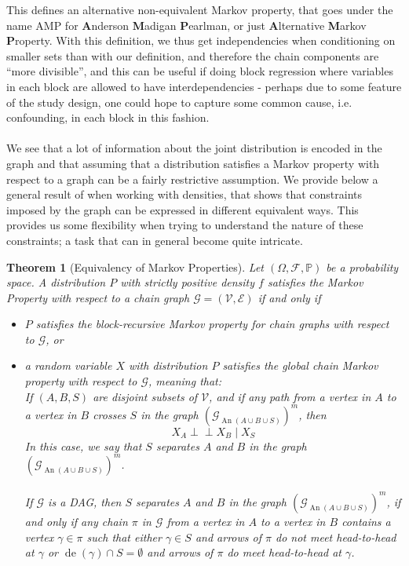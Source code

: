 \documentclass[11pt, a4paper]{memoir}
\theoremstyle{break}
\newtheorem{thm}{Theorem}
\theoremstyle{break}
\theoremstyle{nonumberplain}
\newcommand{\mP}{\mathbb{P}}
\newcommand{\indep}{\perp \!\!\! \perp}
\DeclareMathOperator{\de}{de}
\DeclareMathOperator{\an}{An}
\begin{document}
This defines an alternative non-equivalent Markov property, that goes under the name AMP for \textbf{A}nderson \textbf{M}adigan \textbf{P}earlman, or just \textbf{A}lternative \textbf{M}arkov \textbf{P}roperty. With this definition, we thus get independencies when conditioning on smaller sets than with our definition, and therefore the chain components are \enquote{more divisible}, and this can be useful if doing block regression where variables in each block are allowed to have interdependencies - perhaps due to some feature of the study design, one could hope to capture some common cause, i.e. confounding, in each block in this fashion.
\\\\
We see that a lot of information about the joint distribution is encoded in the graph and that assuming that a distribution satisfies a Markov property with respect to a graph can be a fairly restrictive assumption. We provide below a general result of \cite{Steffen} when working with densities, that shows that constraints imposed by the graph can be expressed in different equivalent ways. This provides us some flexibility when trying to understand the nature of these constraints; a task that can in general become quite intricate.
\begin{thm}[Equivalency of Markov Properties]\label{equiv}
Let $(\Omega, \mathcal{F}, \mP)$ be a probability space. A distribution $P$ with strictly positive density $f$ satisfies the Markov Property with respect to a chain graph $\mathcal{G}=(\mathcal{V},\mathcal{E})$ if and only if
\begin{itemize}
	\item $P$ satisfies the block-recursive Markov property for chain graphs with respect to $\mathcal{G}$, or
	\item a random variable $X$ with distribution $P$ satisfies the \emph{global chain Markov property} with respect to $\mathcal{G}$, meaning that:\\ If $(A,B,S)$ are disjoint subsets of $\mathcal{V}$, and if any path from a vertex in $A$ to a vertex in $B$ crosses $S$ in the graph $\left(\mathcal{G}_{\an(A\cup B\cup S)}\right)^m$, then
	$$X_A\indep X_B\mid X_S$$
	In this case, we say that $S$ separates $A$ and $B$ in the graph $\left(\mathcal{G}_{\an(A\cup B\cup S)}\right)^m$.\\\\
	If $\mathcal{G}$ is a DAG, then $S$ separates $A$ and $B$ in the graph $\left(\mathcal{G}_{\an(A\cup B\cup S)}\right)^m$, if and only if any chain $\pi$ in $\mathcal{G}$ from a vertex in $A$ to a vertex in $B$ contains a vertex $\gamma\in \pi$ such that either $\gamma\in S$ and arrows of $\pi$ do not meet head-to-head at $\gamma$ or $\de(\gamma)\cap S=\emptyset$ and arrows of $\pi$ do meet head-to-head at $\gamma$. 
\end{itemize}
\end{thm}
\end{document}
